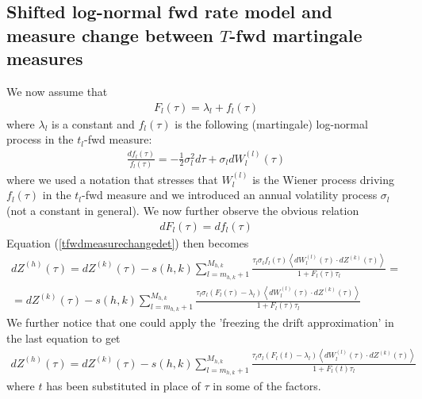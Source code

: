 \documentclass[12pt, a4paper]{article}
\newcommand\be{\begin{eqnarray}}
\newcommand\ee{\end{eqnarray}}
\begin{document}
\subsection{Shifted log-normal fwd rate model and measure change between $T$-fwd martingale measures}

We now assume that
\be 
F_l(\tau) = \lambda_l + f_l(\tau)
\ee
where $\lambda_l$ is a constant and $f_l(\tau)$ is the following (martingale) log-normal process in the $t_l$-fwd measure:
\be 
\frac{d f_l(\tau)}{f_l(\tau)} = -\frac{1}{2}\sigma_l^2 d\tau + \sigma_l dW_l^{(l)}(\tau)
\ee
where we used a notation that stresses that $W_l^{(l)}$ is the Wiener process driving $f_l(\tau)$ in the $t_l$-fwd measure and we introduced an annual volatility process $\sigma_l$ (not a constant in general).
We now further observe the obvious relation 
\be 
d F_l(\tau) = d f_l(\tau)
\ee
Equation (\ref{tfwdmeasurechangedet}) then becomes
\be 
dZ^{(h)}(\tau) = dZ^{(k)}(\tau)- s(h,k) \sum_{l=m_{h,k}+1}^{M_{h,k}} \frac{\tau_l \sigma_l f_l(\tau) \left<d W_l^{(l)}(\tau)\cdot dZ^{(k)}(\tau)\right>}{1 + F_l(\tau)\tau_l } =\\
= dZ^{(k)}(\tau)- s(h,k) \sum_{l=m_{h,k}+1}^{M_{h,k}} \frac{\tau_l \sigma_l (F_l(\tau)-\lambda_l) \left<d W_l^{(l)}(\tau)\cdot dZ^{(k)}(\tau)\right>}{1 + F_l(\tau)\tau_l }
\label{shifttfwdmeasurechange}
\ee
We further notice that one could apply the 'freezing the drift approximation' in the last equation to get
\be 
dZ^{(h)}(\tau) =dZ^{(k)}(\tau)- s(h,k) \sum_{l=m_{h,k}+1}^{M_{h,k}} \frac{\tau_l \sigma_l (F_l(t)-\lambda_l) \left<d W_l^{(l)}(\tau)\cdot dZ^{(k)}(\tau)\right>}{1 + F_l(t)\tau_l }
\ee
where $t$ has been substituted in place of $\tau$ in some of the factors.
\end{document}

